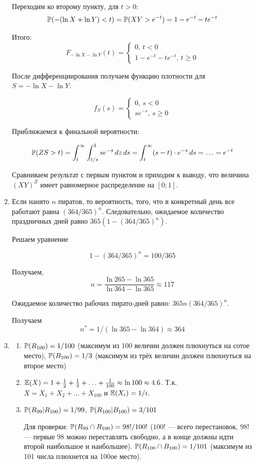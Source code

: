 \documentclass[12pt, a4paper]{article}\usepackage[]{graphicx}\usepackage[]{color}
\begin{document}
\begin{enumerate}
Переходим ко второму пункту, для $t>0$:
\[
\P(-(\ln X + \ln Y) < t)=\P(XY > e^{-t})= 1-e^{-t} -t e^{-t}
\]

Итого:
\[
F_{-\ln X - \ln Y}(t)=\begin{cases}
0, \, t < 0 \\
1-e^{-t} - te^{-t}, \, t \geq 0
\end{cases}
\]

После дифференциирования получаем функцию плотности для $S=-\ln X - \ln Y$:

\[
f_S(s)=\begin{cases}
0, \, s < 0 \\
se^{-s}, \, s \geq 0
\end{cases}
\]

Приближаемся к финальной вероятности:

\[
\P(ZS > t)= \int_t^{\infty} \int_{t/s}^1  se^{-s} \, dz\, ds=
\int_t^{\infty} (s-t)\cdot e^{-s} \, ds= \ldots = e^{-t}
\]

Сравниваем результат с первым пунктом и приходим к выводу, что величина $(XY)^Z$ имеет равномерное распределение на $[0;1]$.

\item Если нанято $n$ пиратов, то вероятность, того, что в конкретный день все работают равна $(364/365)^n$. Следовательно, ожидаемое количество праздничных дней равно $365(1-(364/365)^n)$.

Решаем уравнение

\[
1-(364/365)^n=100/365
\]

Получаем,
\[
n=\frac{\ln 265- \ln 365}{ \ln 364 - \ln 365}\approx 117
\]

Ожидаемое количество рабочих пирато-дней равно: $365n(364/365)^n$.

Получаем
\[
n^*=1/(\ln 365 - \ln 364)\approx 364
\]

\item
\begin{enumerate}
\item $\P(R_{100})=1/100$ (максимум из 100 величин должен плюхнуться на сотое место), $\P(B_{100})=1/3$ (максимум из трёх величин должен плюхнуться на второе место)
\item $\E(X)=1+\frac{1}{2} + \frac{1}{3}+\ldots + \frac{1}{100}\approx \ln 100 \approx 4.6$. Т.к. $X=X_1+X_2+\ldots + X_{100}$ и $\E(X_i)=1/i$.
\item $\P(R_{99} | R_{100})=1/99$, $\P(R_{100}|B_{100})=3/101$

Для проверки: $\P(R_{99} \cap R_{100})=98!/100!$ ($100!$ — всего перестановок, $98!$ — первые 98 можно переставлять свободно, а в конце должны идти второй наибольшое и наибольшее). $\P(R_{100} \cap B_{100})=1/101$ (максимум из 101 числа плюхнется на 100ое место).
\end{enumerate}


\end{enumerate}
\end{document}
